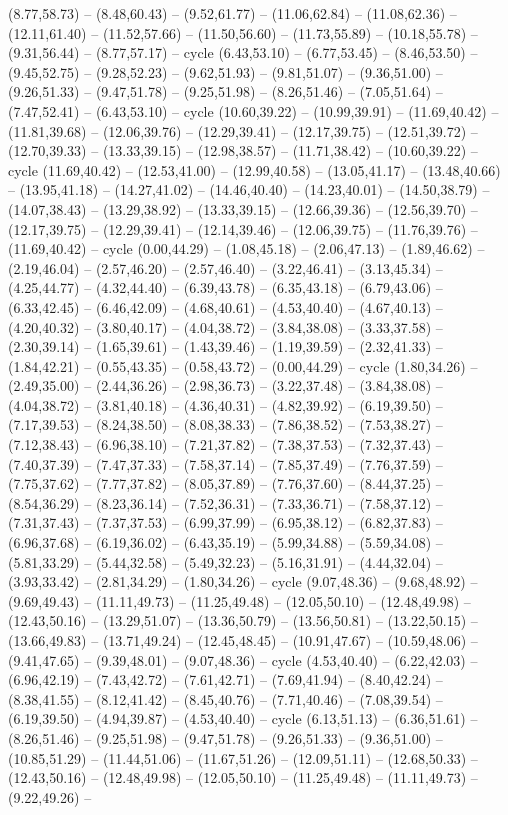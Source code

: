 {(8.77,58.73) -- (8.48,60.43) -- (9.52,61.77) -- (11.06,62.84) -- (11.08,62.36) -- (12.11,61.40) -- (11.52,57.66) -- (11.50,56.60) -- (11.73,55.89) -- (10.18,55.78) -- (9.31,56.44) -- (8.77,57.17) -- cycle (6.43,53.10) -- (6.77,53.45) -- (8.46,53.50) -- (9.45,52.75) -- (9.28,52.23) -- (9.62,51.93) -- (9.81,51.07) -- (9.36,51.00) -- (9.26,51.33) -- (9.47,51.78) -- (9.25,51.98) -- (8.26,51.46) -- (7.05,51.64) -- (7.47,52.41) -- (6.43,53.10) -- cycle (10.60,39.22) -- (10.99,39.91) -- (11.69,40.42) -- (11.81,39.68) -- (12.06,39.76) -- (12.29,39.41) -- (12.17,39.75) -- (12.51,39.72) -- (12.70,39.33) -- (13.33,39.15) -- (12.98,38.57) -- (11.71,38.42) -- (10.60,39.22) -- cycle (11.69,40.42) -- (12.53,41.00) -- (12.99,40.58) -- (13.05,41.17) -- (13.48,40.66) -- (13.95,41.18) -- (14.27,41.02) -- (14.46,40.40) -- (14.23,40.01) -- (14.50,38.79) -- (14.07,38.43) -- (13.29,38.92) -- (13.33,39.15) -- (12.66,39.36) -- (12.56,39.70) -- (12.17,39.75) -- (12.29,39.41) -- (12.14,39.46) -- (12.06,39.75) -- (11.76,39.76) -- (11.69,40.42) -- cycle (0.00,44.29) -- (1.08,45.18) -- (2.06,47.13) -- (1.89,46.62) -- (2.19,46.04) -- (2.57,46.20) -- (2.57,46.40) -- (3.22,46.41) -- (3.13,45.34) -- (4.25,44.77) -- (4.32,44.40) -- (6.39,43.78) -- (6.35,43.18) -- (6.79,43.06) -- (6.33,42.45) -- (6.46,42.09) -- (4.68,40.61) -- (4.53,40.40) -- (4.67,40.13) -- (4.20,40.32) -- (3.80,40.17) -- (4.04,38.72) -- (3.84,38.08) -- (3.33,37.58) -- (2.30,39.14) -- (1.65,39.61) -- (1.43,39.46) -- (1.19,39.59) -- (2.32,41.33) -- (1.84,42.21) -- (0.55,43.35) -- (0.58,43.72) -- (0.00,44.29) -- cycle (1.80,34.26) -- (2.49,35.00) -- (2.44,36.26) -- (2.98,36.73) -- (3.22,37.48) -- (3.84,38.08) -- (4.04,38.72) -- (3.81,40.18) -- (4.36,40.31) -- (4.82,39.92) -- (6.19,39.50) -- (7.17,39.53) -- (8.24,38.50) -- (8.08,38.33) -- (7.86,38.52) -- (7.53,38.27) -- (7.12,38.43) -- (6.96,38.10) -- (7.21,37.82) -- (7.38,37.53) -- (7.32,37.43) -- (7.40,37.39) -- (7.47,37.33) -- (7.58,37.14) -- (7.85,37.49) -- (7.76,37.59) -- (7.75,37.62) -- (7.77,37.82) -- (8.05,37.89) -- (7.76,37.60) -- (8.44,37.25) -- (8.54,36.29) -- (8.23,36.14) -- (7.52,36.31) -- (7.33,36.71) -- (7.58,37.12) -- (7.31,37.43) -- (7.37,37.53) -- (6.99,37.99) -- (6.95,38.12) -- (6.82,37.83) -- (6.96,37.68) -- (6.19,36.02) -- (6.43,35.19) -- (5.99,34.88) -- (5.59,34.08) -- (5.81,33.29) -- (5.44,32.58) -- (5.49,32.23) -- (5.16,31.91) -- (4.44,32.04) -- (3.93,33.42) -- (2.81,34.29) -- (1.80,34.26) -- cycle (9.07,48.36) -- (9.68,48.92) -- (9.69,49.43) -- (11.11,49.73) -- (11.25,49.48) -- (12.05,50.10) -- (12.48,49.98) -- (12.43,50.16) -- (13.29,51.07) -- (13.36,50.79) -- (13.56,50.81) -- (13.22,50.15) -- (13.66,49.83) -- (13.71,49.24) -- (12.45,48.45) -- (10.91,47.67) -- (10.59,48.06) -- (9.41,47.65) -- (9.39,48.01) -- (9.07,48.36) -- cycle (4.53,40.40) -- (6.22,42.03) -- (6.96,42.19) -- (7.43,42.72) -- (7.61,42.71) -- (7.69,41.94) -- (8.40,42.24) -- (8.38,41.55) -- (8.12,41.42) -- (8.45,40.76) -- (7.71,40.46) -- (7.08,39.54) -- (6.19,39.50) -- (4.94,39.87) -- (4.53,40.40) -- cycle (6.13,51.13) -- (6.36,51.61) -- (8.26,51.46) -- (9.25,51.98) -- (9.47,51.78) -- (9.26,51.33) -- (9.36,51.00) -- (10.85,51.29) -- (11.44,51.06) -- (11.67,51.26) -- (12.09,51.11) -- (12.68,50.33) -- (12.43,50.16) -- (12.48,49.98) -- (12.05,50.10) -- (11.25,49.48) -- (11.11,49.73) -- (9.22,49.26) -- }
